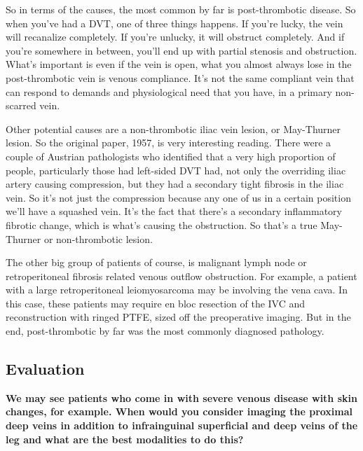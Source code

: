 \documentclass[
]{book}
\begin{document}
So in terms of the causes, the most common by far is post-thrombotic
disease. So when you've had a DVT, one of three things happens. If
you're lucky, the vein will recanalize completely. If you're unlucky, it
will obstruct completely. And if you're somewhere in between, you'll end
up with partial stenosis and obstruction. What's important is even if
the vein is open, what you almost always lose in the post-thrombotic
vein is venous compliance. It's not the same compliant vein that can
respond to demands and physiological need that you have, in a primary
non-scarred vein.

Other potential causes are a non-thrombotic iliac vein lesion, or
May-Thurner lesion. So the original paper, 1957, is very interesting
reading.\citep{may1957} There were a couple of Austrian pathologists who
identified that a very high proportion of people, particularly those had
left-sided DVT had, not only the overriding iliac artery causing
compression, but they had a secondary tight fibrosis in the iliac
vein.\citep{nazzal2015} So it's not just the compression because any one of
us in a certain position we'll have a squashed vein. It's the fact that
there's a secondary inflammatory fibrotic change, which is what's
causing the obstruction. So that's a true May-Thurner or non-thrombotic
lesion.\citep{liddell2018, rollo2017}

The other big group of patients of course, is malignant lymph node or
retroperitoneal fibrosis related venous outflow obstruction. For
example, a patient with a large retroperitoneal leiomyosarcoma may be
involving the vena cava. In this case, these patients may require en
bloc resection of the IVC and reconstruction with ringed PTFE, sized off
the preoperative imaging.\citep{quinones-baldrich2012, fiore2012} But in the
end, post-thrombotic by far was the most commonly diagnosed pathology.

\hypertarget{evaluation-20}{%
\subsection{Evaluation}\label{evaluation-20}}

\textbf{We may see patients who come in with severe venous disease with skin
changes, for example. When would you consider imaging the proximal deep
veins in addition to infrainguinal superficial and deep veins of the leg
and what are the best modalities to do this?}
\end{document}
